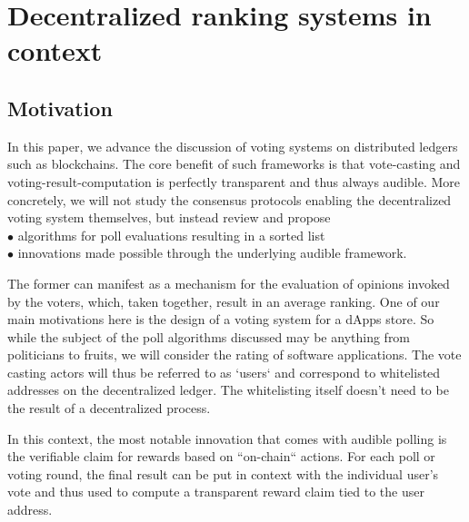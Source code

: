 
\section{Decentralized ranking systems in context}
\subsection{Motivation} 
In this paper, we advance the discussion of voting systems on distributed ledgers such as blockchains. The core benefit of such frameworks is  that vote-casting and voting-result-computation is perfectly transparent and thus always audible.
More concretely, we will not study the consensus protocols enabling the decentralized voting system themselves, but instead review and propose\\
$\bullet$ algorithms for poll evaluations resulting in a sorted list\\
$\bullet$ innovations made possible through the underlying audible framework.

The former can manifest as a mechanism for the evaluation of opinions invoked by the voters, which, taken together, result in an average ranking. One of our main motivations here is the design of a voting system for a dApps store. So while the subject of the poll algorithms discussed may be anything from politicians to fruits, we will consider the rating of software applications. The vote casting actors will thus be referred to as `users` and correspond to whitelisted addresses on the decentralized ledger. The whitelisting itself doesn't need to be the result of a decentralized process. 

In this context, the most notable innovation that comes with audible polling is the verifiable claim for rewards based on ``on-chain`` actions. For each poll or voting round, the final result can be put in context with the individual user's vote and thus used to compute a transparent reward claim tied to the user address.

{\color{red}{TODO: Note on exposure/money as reward}}
